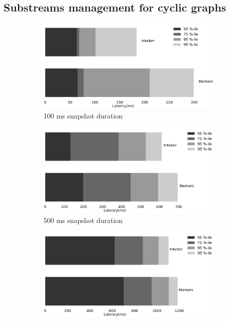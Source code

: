 \subsection{Substreams management for cyclic graphs}
\begin{figure}[t!]
    \begin{subfigure}[b]{0.32\textwidth}
            \includegraphics[width=0.99\textwidth]{pics/buffering_latencies_barh_100.pdf}
            \caption{100 ms snapshot duration}
            \label{100ms_snapshot}
    \end{subfigure}
    \hspace{5mm}
    \begin{subfigure}[b]{0.32\textwidth}
            \includegraphics[width=0.99\textwidth]{pics/buffering_latencies_barh_500.pdf}
            \caption{500 ms snapshot duration}
            \label{500ms_snapshot}
    \end{subfigure}
    \hspace{5mm}
    \begin{subfigure}[b]{0.32\textwidth}
            \includegraphics[width=0.99\textwidth]{pics/buffering_latencies_barh_1000.pdf}

\end{subfigure}
\end{figure}
